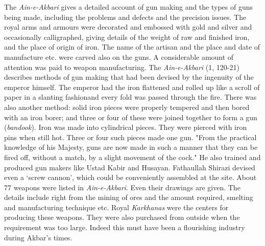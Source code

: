 The \textit{Ain-e-Akbari} gives a detailed account of gun making and the types of guns being made, including the problems and defects and the precision issues. The royal arms and armours were decorated and embossed with gold and silver and occasionally calligraphed, giving details of the weight of raw and finished iron, and the place of origin of iron. The name of the artisan and the place and date of manufacture etc. were carved also on the guns. A considerable amount of attention was paid to weapon manufacturing. The \textit{Ain-e-Akbari} (1, 120-21) describes methods of gun making that had been devised by the ingenuity of the emperor himself. The emperor had the iron flattened and rolled up like a scroll of paper in a slanting fashionand every fold was passed through the fire. There was also another method: solid iron pieces were properly tempered and then bored with an iron borer; and three or four of these were joined together to form a gun (\textit{bandook}). Iron was made into cylindrical pieces. They were pierced with iron pins when still hot. Three or four such pieces made one gun. "From the practical knowledge of his Majesty, guns are now made in such a manner that they can be fired off, without a match, by a slight movement of the cock." He also trained and produced gun makers like Ustad Kabir and Husayan. Fathaullah Shirazi devised even a `screw cannon', which could be conveniently assembled at the site. About 77 weapons were listed in \textit{Ain-e-Akbari}. Even their drawings are given. The details include right from the mining of ores and the amount required, smelting and manufacturing technique etc. Royal \textit{Karkhanas} were the centers for producing these weapons. They were also purchased from outside when the requirement was too large. Indeed this must have been a flourishing industry during Akbar's times.

